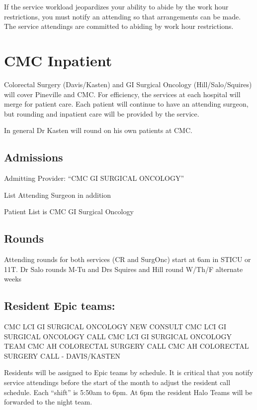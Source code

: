 \documentclass[
]{book}
\begin{document}
If the service workload jeopardizes your ability to abide by the work hour restrictions, you must notify an attending so that arrangements can be made. The service attendings are committed to abiding by work hour restrictions.

\hypertarget{cmc-inpatient}{%
\chapter{CMC Inpatient}\label{cmc-inpatient}}

Colorectal Surgery (Davis/Kasten) and GI Surgical Oncology (Hill/Salo/Squires) will cover Pineville and CMC. For efficiency, the services at each hospital will merge for patient care. Each patient will continue to have an attending surgeon, but rounding and inpatient care will be provided by the service.

In general Dr Kasten will round on his own patients at CMC.

\hypertarget{admissions}{%
\section{Admissions}\label{admissions}}

Admitting Provider: ``CMC GI SURGICAL ONCOLOGY''

List Attending Surgeon in addition

Patient List is CMC GI Surgical Oncology

\hypertarget{rounds}{%
\section{Rounds}\label{rounds}}

Attending rounds for both services (CR and SurgOnc) start at 6am in STICU or 11T. Dr Salo rounds M-Tu and Drs Squires and Hill round W/Th/F alternate weeks

\hypertarget{resident-epic-teams}{%
\section{Resident Epic teams:}\label{resident-epic-teams}}

CMC LCI GI SURGICAL ONCOLOGY NEW CONSULT
CMC LCI GI SURGICAL ONCOLOGY CALL
CMC LCI GI SURGICAL ONCOLOGY TEAM
CMC AH COLORECTAL SURGERY CALL
CMC AH COLORECTAL SURGERY CALL - DAVIS/KASTEN

Residents will be assigned to Epic teams by schedule. It is critical that you notify service attendings before the start of the month to adjust the resident call schedule. Each ``shift'' is 5:50am to 6pm. At 6pm the resident Halo Teams will be forwarded to the night team.
\end{document}
